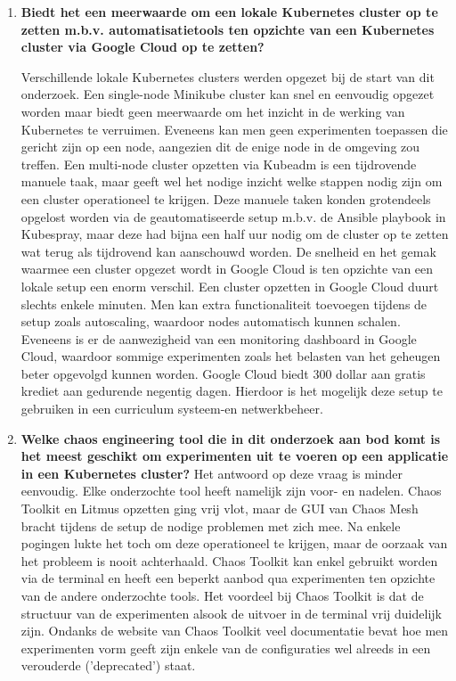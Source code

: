 \begin{enumerate}
\item {\bf Biedt het een meerwaarde om een lokale Kubernetes cluster op te zetten m.b.v. automatisatietools ten opzichte van een Kubernetes cluster via Google Cloud op te zetten?}

Verschillende lokale Kubernetes clusters werden opgezet bij de start van dit onderzoek. Een single-node Minikube cluster kan snel en eenvoudig opgezet worden maar biedt geen meerwaarde om het inzicht in de werking van Kubernetes te verruimen. Eveneens kan men geen experimenten toepassen die gericht zijn op een node, aangezien dit de enige node in de omgeving zou treffen. Een multi-node cluster opzetten via Kubeadm is een tijdrovende manuele taak, maar geeft wel het nodige inzicht welke stappen nodig zijn om een cluster operationeel te krijgen. Deze manuele taken konden grotendeels opgelost worden via de geautomatiseerde setup m.b.v. de Ansible playbook in Kubespray, maar deze had bijna een half uur nodig om de cluster op te zetten wat terug als tijdrovend kan aanschouwd worden.
\newline De snelheid en het gemak waarmee een cluster opgezet wordt in Google Cloud is ten opzichte van een lokale setup een enorm verschil. Een cluster opzetten in Google Cloud duurt slechts enkele minuten. Men kan extra functionaliteit toevoegen tijdens de setup zoals autoscaling, waardoor nodes automatisch kunnen schalen. Eveneens is er de aanwezigheid van een monitoring dashboard in Google Cloud, waardoor sommige experimenten zoals het belasten van het geheugen beter opgevolgd kunnen worden. Google Cloud biedt 300 dollar aan gratis krediet aan gedurende negentig dagen. Hierdoor is het mogelijk deze setup te gebruiken in een curriculum systeem-en netwerkbeheer.     
\newline 
\item {\bf Welke chaos engineering tool die in dit onderzoek aan bod komt is het meest geschikt om experimenten uit te voeren op een applicatie in een Kubernetes cluster?}
\newline Het antwoord op deze vraag is minder eenvoudig. Elke onderzochte tool heeft namelijk zijn voor- en nadelen. Chaos Toolkit en Litmus opzetten ging vrij vlot, maar de GUI van Chaos Mesh bracht tijdens de setup de nodige problemen met zich mee. Na enkele pogingen lukte het toch om deze operationeel te krijgen, maar de oorzaak van het probleem is nooit achterhaald. 
\newline Chaos Toolkit kan enkel gebruikt worden via de terminal en heeft een beperkt aanbod qua experimenten ten opzichte van de andere onderzochte tools. Het voordeel bij Chaos Toolkit is dat de structuur van de experimenten alsook de uitvoer in de terminal vrij duidelijk zijn. Ondanks de website van Chaos Toolkit veel documentatie bevat hoe men experimenten vorm geeft zijn enkele van de configuraties wel alreeds in een verouderde ('deprecated') staat.

\end{enumerate}
